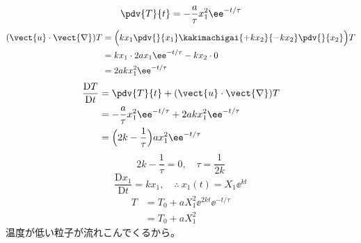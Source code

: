 \[ \pdv{T}{t}=-\frac{a}{\tau}x_{1}^{2}\ee^{-t/\tau} \]
\begin{align*}
(\vect{u}\cdot\vect{\nabla})T&=\Bigl(kx_{1}\pdv{}{x_{1}}\kakimachigai{+kx_{2}}{-kx_{2}}\pdv{}{x_{2}}\Bigr)T\\
&=kx_{1}\cdot2ax_{1}\ee^{-t/\tau}-kx_{2}\cdot0\\
&=2akx_{1}^{2}\ee^{-t/\tau}
\end{align*}
\begin{align*}
\frac{\mathrm{D}T}{\mathrm{D}t}&=\pdv{T}{t}+(\vect{u}\cdot\vect{\nabla})T\\
&=-\frac{a}{\tau}x_{1}^{2}\ee^{-t/\tau}+2akx_{1}^{2}\ee^{-t/\tau}\\
&=\Bigl(2k-\frac{1}{\tau}\Bigr)ax_{1}^{2}\ee^{-t/\tau}
\end{align*}
\[ 2k-\frac{1}{\tau}=0,\quad \tau=\frac{1}{2k} \]
\[ \frac{\mathrm{D}x_{1}}{\mathrm{D}t}=kx_{1},\quad \therefore\ x_{1}(t)=X_{1}\ee^{kt} \]
\begin{align*}
T&=T_{0}+aX_{1}^{2}\ee^{2kt}\ee^{-t/\tau}\\
&=T_{0}+aX_{1}^{2}
\end{align*}
温度が低い粒子が流れこんでくるから。

